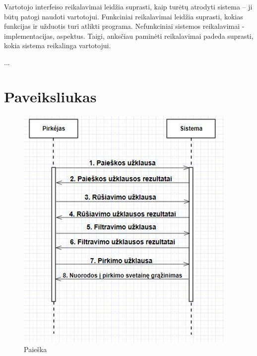 \documentclass{VUMIFPSkursinis}
\begin{document}
Vartotojo interfeiso reikalavimai leidžia suprasti, kaip turėtų atrodyti sistema – ji būtų patogi naudoti vartotojui. Funkciniai reikalavimai leidžia suprasti, kokias funkcijas ir užduotis turi atlikti programa. Nefunkciniai sistemos reikalavimai - implementacijas, aspektus. Taigi, anksčiau paminėti reikalavimai padeda suprasti, kokia sistema reikalinga vartotojui.

...

\printbibliography[heading=bibintoc]  %

\appendix  %

\section{Paveiksliukas}
\begin{figure}[H]
  \centering
  \includegraphics[scale=1]{img/paieska1}
  \caption{Paieška}
  \label{paieska}
\end{figure}
\end{document}
